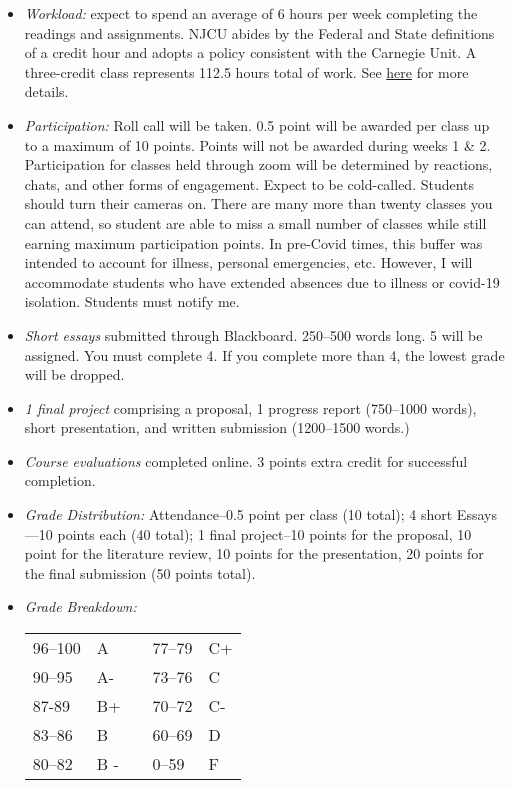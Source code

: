 \documentclass[article,oneside]{memoir}
\begin{document}
\begin{itemize}


\item \textit{Workload:} expect to spend an average of 6 hours per week completing the readings and assignments. NJCU abides by the Federal and State definitions of a credit hour and adopts a policy consistent with the Carnegie Unit. A three-credit class represents 112.5 hours total of work. See \href{http://scottoconnor.org/resources/Credit.pdf}{here} for more details.

\item \textit{Participation:} Roll call will be taken. 0.5 point will be awarded per class up to a maximum of 10 points. Points will not be awarded during weeks 1 \& 2. Participation for classes held through zoom will be determined by reactions, chats, and other forms of engagement. Expect to be cold-called. Students should turn their cameras on. There are many more than twenty classes you can attend, so student are able to miss a small number of classes while still earning maximum participation points. In pre-Covid times, this buffer was intended to account for illness, personal emergencies, etc. However, I will accommodate students who have extended absences due to illness or covid-19 isolation. Students must notify me. 


\item \textit{Short essays} submitted through Blackboard. 250--500 words long. 5 will be assigned. You must complete 4. If you complete more than 4, the lowest grade will be dropped.
 
\item \textit{1 final project} comprising a proposal, 1 progress report (750--1000 words), short presentation, and written submission (1200--1500 words.)

\item \textit{Course evaluations} completed online. 3 points extra credit for successful completion.


\item \textit{Grade Distribution:} Attendance--0.5 point per class (10 total); 4 short Essays---10 points each (40 total); 1 final project--10 points for the proposal, 10 point for the literature review, 10 points for the presentation, 20 points for the final submission (50 points total).










\item \textit{Grade Breakdown:}

 \begin{tabular}{ | l | l | p{2cm} | l | l | }
    \hline 
96--100 & A  & &  77--79 &  C+ \\  
90--95 & A- & &  73--76 & C \\
87-89 & B+ &  &  70--72 & C- \\ 
83--86 & B  & &  60--69 & D\\
80--82 & B - & & 0--59 & F\\ \hline
    \end{tabular}


\end{itemize}
\end{document}

